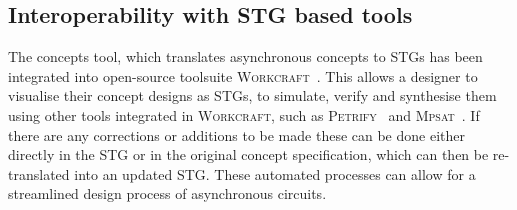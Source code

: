 \documentclass[british, journal]{IEEEtran}
\newcommand{\noun}[1]{\textsc{#1}}
\begin{document}
%
%
%

\vspace{-2mm}

\subsection{Interoperability with STG based tools \label{sub:interop-with-stg}}

%

The concepts tool, which translates asynchronous concepts to STGs has been
integrated into open-source toolsuite \noun{Workcraft}~\cite{Workcraft_website}.
This allows a designer to visualise their concept designs as STGs, to simulate,
verify and synthesise them using other tools integrated in \noun{Workcraft},
such as \noun{Petrify}~\cite{Cortadella} and
\noun{Mpsat}~\cite{khomenko2004detecting}.
If there are any corrections or additions to be made these can be done
either directly in the STG or in the original concept specification, which can then
be re-translated into an updated STG. These automated processes can allow for a
streamlined design process of asynchronous circuits.
\end{document}

